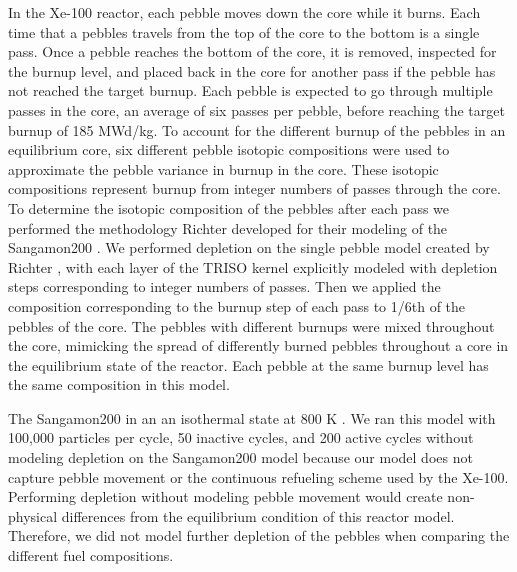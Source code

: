 In the Xe-100 reactor, each pebble moves down the core while it burns. Each 
time that a pebbles travels from the top of the core to the bottom is a single 
pass. Once a pebble reaches the bottom of the core, it is removed, inspected for 
the burnup level, and placed back in the core for another pass if the pebble has 
not reached the target burnup. Each pebble is expected to 
go through multiple passes in the core, an average 
of six passes per pebble, before reaching the target burnup of 185 
MWd/kg. To account for the different burnup of 
the pebbles in an equilibrium core, 
six different pebble isotopic compositions were used to approximate the pebble
variance in burnup in the core. These isotopic compositions represent burnup from 
integer numbers of passes through the core.
To determine the isotopic composition of the 
pebbles after each pass we performed the methodology 
Richter developed for their modeling of the Sangamon200 \cite{richter_isotopic_2022}. 
We performed depletion on the single pebble model created by Richter 
\cite{richter_zoerichterphlox_2022},
with each layer of the \gls{TRISO} kernel explicitly modeled
with depletion steps 
corresponding to integer numbers of passes. Then we 
applied the composition corresponding to the burnup step of each pass 
to 1/6th of the pebbles of the core. The pebbles with different burnups 
were mixed throughout the core, mimicking the spread of 
differently burned pebbles throughout a core in the equilibrium state 
of the reactor. Each pebble at the same burnup level has the same 
composition in this model.   

The Sangamon200 in an an isothermal state at 800 K 
\cite{richter_isotopic_2022}.
We ran this model with 100,000 particles per cycle, 50 inactive cycles, 
and 200 active cycles without modeling depletion on the Sangamon200 model 
because our model does not capture pebble movement or the continuous 
refueling scheme used by the Xe-100. Performing depletion without modeling 
pebble movement 
would create non-physical differences from the equilibrium condition of 
this reactor model. Therefore, we did not model further depletion of the 
pebbles when comparing the different fuel compositions.

